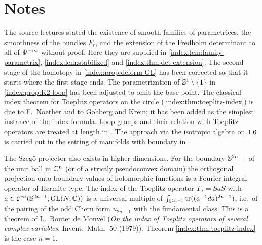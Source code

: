 \section*{Notes}
The source lectures stated the existence of smooth families of parametrices,
the smoothness of the bundles $F_r$, and the extension of the Fredholm
determinant to all of $\Psi^{-\infty}$ without proof. Here they are supplied
in \cref{index:lem:family-parametrix}, \cref{index:lem:stabilized} and
\cref{index:thm:det-extension}. The second stage of the homotopy in
\cref{index:prop:deform-GL} has been corrected so that it starts where the
first stage ends. The parametrization of $\mathbb{S}^1\setminus\{1\}$ in
\cref{index:prop:K2-loop} has been adjusted to omit the base point. The
classical index theorem for Toeplitz operators on the circle
(\cref{index:thm:toeplitz-index}) is due to F.~Noether and to Gohberg and
Krein; it has been added as the simplest instance of the index formula. Loop
groups and their relation with Toeplitz operators are treated at length in
\cite{Pressley-Segal}. The approach via the isotropic algebra on $1.6$ is
carried out in the setting of manifolds with boundary in \cite{Melrose-Rochon}.

The Szeg\H{o} projector also exists in higher dimensions. For the boundary
$\mathbb{S}^{2n-1}$ of the unit ball in $\mathbb{C}^n$ (or of a strictly pseudoconvex
domain) the orthogonal projection onto boundary values of holomorphic
functions is a Fourier integral operator of Hermite type. The index of the
Toeplitz operator $T_a=SaS$ with $a\in\mathcal{C}^\infty(\mathbb{S}^{2n-1};\operatorname{GL}(N,\mathbb{C}))$ is a
universal multiple of $\int_{\mathbb{S}^{2n-1}}\operatorname{tr}((a^{-1}da)^{2n-1})$, i.e.\ of
the pairing of the odd Chern form $u_{2n-1}$ with the fundamental class. This
is a theorem of L.~Boutet de Monvel (\emph{On the index of Toeplitz operators
of several complex variables}, Invent.\ Math.\ 50 (1979)). Theorem
\ref{index:thm:toeplitz-index} is the case $n=1$.
